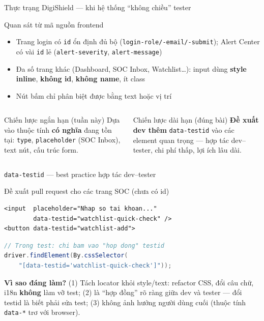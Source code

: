 \documentclass[aspectratio=169,12pt]{beamer}
\begin{document}
\begin{frame}{Thực trạng DigiShield --- khi hệ thống ``không chiều'' tester}
  \begin{block}{Quan sát từ mã nguồn frontend}
    \begin{itemize}
      \item Trang login có \texttt{id} ổn định đủ bộ
            (\texttt{login-role/-email/-submit}); Alert Center có vài
            \texttt{id} lẻ (\texttt{alert-severity}, \texttt{alert-message})
      \item Đa số trang khác (Dashboard, SOC Inbox, Watchlist\ldots):
            input dùng \textbf{style inline}, \textbf{không id}, \textbf{không name}, ít class
      \item Nút bấm chỉ phân biệt được bằng text hoặc vị trí
    \end{itemize}
  \end{block}

  \begin{columns}[T]
    \begin{exampleblock}{Chiến lược ngắn hạn (tuần này)}
      Dựa vào thuộc tính \textbf{có nghĩa} đang tồn tại:
      \texttt{type}, \texttt{placeholder} (SOC Inbox), text nút, cấu trúc form.
    \end{exampleblock}

    \begin{exampleblock}{Chiến lược dài hạn (đúng bài)}
      \textbf{Đề xuất dev thêm} \texttt{data-testid} vào các element quan trọng
      --- hợp tác dev--tester, chi phí thấp, lợi ích lâu dài.
    \end{exampleblock}
  \end{columns}
\end{frame}

\begin{frame}[fragile]{\texttt{data-testid} --- best practice hợp tác dev--tester}
  \begin{exampleblock}{Đề xuất pull request cho các trang SOC (chưa có id)}
\begin{lstlisting}[language={},basicstyle=\ttfamily\scriptsize]
<input  placeholder="Nhap so tai khoan..."
        data-testid="watchlist-quick-check" />
<button data-testid="watchlist-add">
\end{lstlisting}
  \end{exampleblock}

\begin{lstlisting}[language=java,basicstyle=\ttfamily\scriptsize]
// Trong test: chi bam vao "hop dong" testid
driver.findElement(By.cssSelector(
    "[data-testid='watchlist-quick-check']"));
\end{lstlisting}

  {\small \textbf{Vì sao đáng làm?} (1) Tách locator khỏi style/text: refactor
  CSS, đổi câu chữ, i18n \textbf{không} làm vỡ test; (2) là ``hợp đồng'' rõ ràng
  giữa dev và tester --- đổi testid là biết phải sửa test; (3) không ảnh hưởng
  người dùng cuối (thuộc tính \texttt{data-*} trơ với browser).}
\end{frame}
\end{document}
